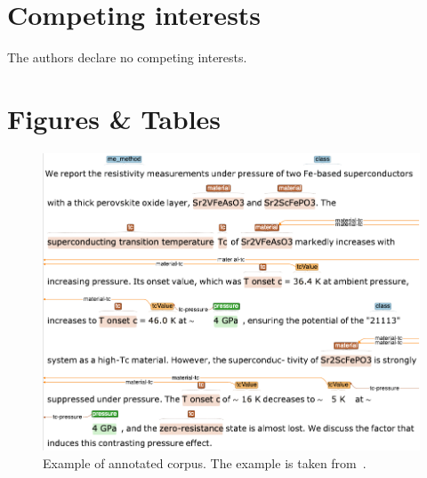 \documentclass[fleqn,10pt]{wlscirep}
\begin{document}
\section*{Competing interests} 

The authors declare no competing interests.

\section*{Figures \& Tables}

\begin{figure}[ht]
  \centering
  \includegraphics[width=\linewidth]{example-annotated-corpus-postprocess.png}
  \caption{Example of annotated corpus. The example is taken from~\cite{Kotegawa2009ContrastingPE}.}
  \label{fig:example-annotations-and-links}
\end{figure}
\end{document}

